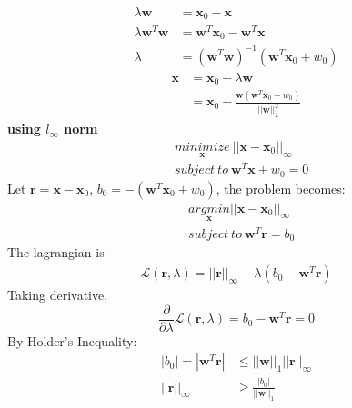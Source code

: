 \documentclass[11pt]{article}
\begin{document}
\begin{equation}
\begin{split}
\lambda\pmb{w}&=\pmb{x}_0 - \pmb{x}\\
\lambda\pmb{w}^T\pmb{w} &= \pmb{w}^T\pmb{x}_0-\pmb{w}^T\pmb{x}\\
\lambda &= \left(\pmb{w}^T\pmb{w}\right)^{-1}(\pmb{w}^T\pmb{x}_0+w_0)
\end{split}
\end{equation}
\begin{equation}
\begin{split}
\pmb{x} &= \pmb{x}_0-\lambda\pmb{w}\\
&=\pmb{x}_0-\frac{\pmb{w}(\pmb{w}^T\pmb{x}_0+w_0)}{||\pmb{w}||_2^2}
\end{split}
\end{equation}
\noindent\textbf{using $l_\infty$ norm}\\
\begin{equation}
\begin{split}
&\underset{\pmb{x}}{minimize}\ ||\pmb{x} - \pmb{x}_0||_{\infty}\\
&subject\ to\ \pmb{w}^T\pmb{x} + w_0 = 0
\end{split}
\end{equation}
Let $\pmb{r} = \pmb{x} - \pmb{x}_0$, $b_0 = -(\pmb{w}^T\pmb{x}_0+w_0)$, the problem becomes:
\begin{equation}
\begin{split}
&\underset{\pmb{x}}{argmin}||\pmb{x}-\pmb{x}_0||_\infty\\
&subject\ to\ \pmb{w}^T\pmb{r}=b_0
\end{split}
\end{equation}
The lagrangian is
\begin{equation}
\begin{split}
\mathcal{L}(\pmb{r},\lambda)=||\pmb{r}||_{\infty}+\lambda(b_0-\pmb{w}^T\pmb{r})
\end{split}
\end{equation}
Taking derivative,
\begin{equation}
\frac{\partial}{\partial\lambda}\mathcal{L}(\pmb{r},\lambda)=b_0-\pmb{w}^T\pmb{r}=0
\end{equation}
By Holder's Inequality:
\begin{equation}
\begin{split}
|b_0|=|\pmb{w}^T\pmb{r}| &\le||\pmb{w}||_1||\pmb{r}||_\infty\\
||\pmb{r}||_\infty&\ge\frac{|b_0|}{||\pmb{w}||_1}
\end{split}
\end{equation}
\end{document}
